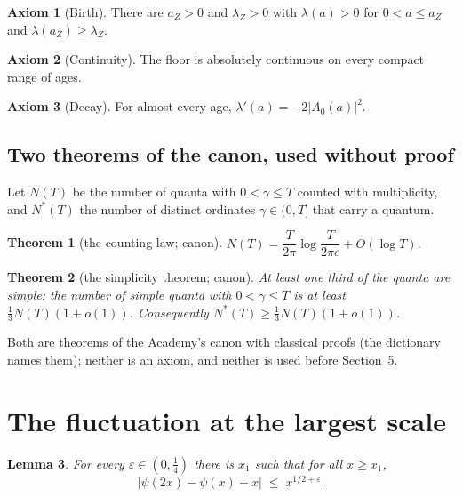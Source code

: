 \documentclass[11pt]{article}
\newtheorem{theorem}{Theorem}[section]
\newtheorem{lemma}[theorem]{Lemma}
\theoremstyle{definition}
\newtheorem{axiom}{Axiom}
\theoremstyle{remark}
\newcommand{\ps}{\psi}
\begin{document}
\begin{axiom}[Birth]\label{ax:birth}
There are $a_Z>0$ and $\lambda_Z>0$ with $\lambda(a)>0$ for $0<a\le a_Z$ and $\lambda(a_Z)\ge\lambda_Z$.
\end{axiom}

\begin{axiom}[Continuity]\label{ax:cont}
The floor is absolutely continuous on every compact range of ages.
\end{axiom}

\begin{axiom}[Decay]\label{ax:decay}
For almost every age, $\lambda'(a)=-2|A_0(a)|^2$.
\end{axiom}

\subsection*{Two theorems of the canon, used without proof}
Let $N(T)$ be the number of quanta with $0<\gamma\le T$ counted with multiplicity, and $N^*(T)$ the number of distinct ordinates $\gamma\in(0,T]$ that carry a quantum.

\begin{theorem}[the counting law; canon]\label{thm:count}
$N(T)=\dfrac{T}{2\pi}\log\dfrac{T}{2\pi e}+O(\log T)$.
\end{theorem}

\begin{theorem}[the simplicity theorem; canon]\label{thm:simple}
At least one third of the quanta are simple: the number of simple quanta with $0<\gamma\le T$ is at least $\tfrac13N(T)(1+o(1))$. Consequently $N^*(T)\ge\tfrac13N(T)(1+o(1))$.
\end{theorem}

Both are theorems of the Academy's canon with classical proofs (the dictionary names them); neither is an axiom, and neither is used before Section~5.

\section{The fluctuation at the largest scale}

\begin{lemma}\label{lem:block}
For every $\varepsilon\in(0,\tfrac14)$ there is $x_1$ such that for all $x\ge x_1$,
\[
\big|\ps(2x)-\ps(x)-x\big|\;\le\;x^{1/2+\varepsilon}.
\]
\end{lemma}
\end{document}
